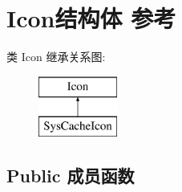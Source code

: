 \hypertarget{struct_icon}{}\section{Icon结构体 参考}
\label{struct_icon}
类 Icon 继承关系图\+:\begin{figure}[H]
\begin{center}
\leavevmode
\includegraphics[height=2.000000cm]{struct_icon}
\end{center}
\end{figure}
\subsection*{Public 成员函数}
